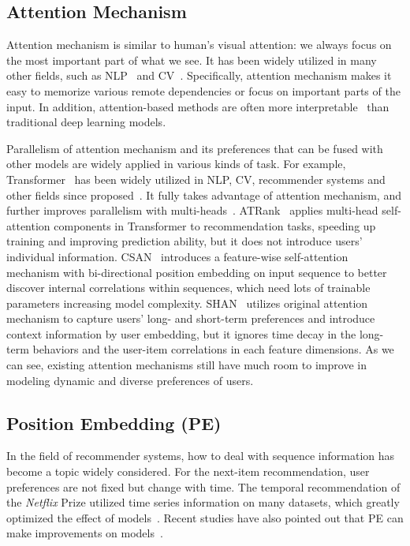 \documentclass[preprint,12pt]{elsarticle}
\begin{document}
\begin{sloppypar}
\subsection{Attention Mechanism}

Attention mechanism is similar to human's visual attention: we always focus on the most important part of what we see. It has been widely utilized in many other fields, such as NLP~\cite{shen2018disan, yin2016abcnn} and CV~\cite{thanikasalam2019target, zhang2020multimodal}. Specifically, attention mechanism makes it easy to memorize various remote dependencies or focus on important parts of the input. In addition, attention-based methods are often more interpretable~\cite{sha2017interpretable} than traditional deep learning models.

Parallelism of attention mechanism and its preferences that can be fused with other models are widely applied in various kinds of task. For example, Transformer~\cite{vaswani2017attention} has been widely utilized in NLP, CV, recommender systems and other fields since proposed~\cite{ni2019modeling, cao2019cross}. It fully takes advantage of attention mechanism, and further improves parallelism with multi-heads~\cite{lyu2019attention}. ATRank~\cite{zhou2018atrank} applies multi-head self-attention components in Transformer to recommendation tasks, speeding up training and improving prediction ability, but it does not introduce users' individual information. CSAN~\cite{huang2018csan} introduces a feature-wise self-attention mechanism with bi-directional position embedding on input sequence to better discover internal correlations within sequences, which need lots of trainable parameters increasing model complexity. SHAN~\cite{ying2018sequential} utilizes original attention mechanism to capture users' long- and short-term preferences and introduce context information by user embedding, but it ignores time decay in the long-term behaviors and the user-item correlations in each feature dimensions. As we can see, existing attention mechanisms still have much room to improve in modeling dynamic and diverse preferences of users.

\subsection{Position Embedding (PE)}

In the field of recommender systems, how to deal with sequence information has become a topic widely considered. For the next-item recommendation, user preferences are not fixed but change with time. The temporal recommendation of the \emph{Netflix} Prize utilized time series information on many datasets, which greatly optimized the effect of models~\cite{kang2018self}. Recent studies have also pointed out that PE can make improvements on models~\cite{huang2018csan, gehring2017convolutional}.


\end{sloppypar}
\end{document}
